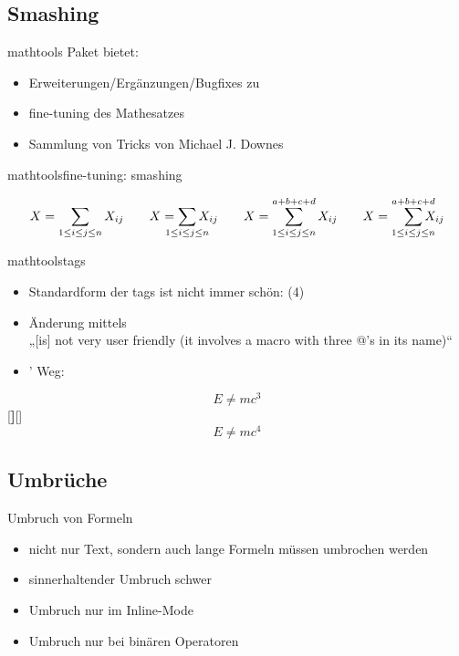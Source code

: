 \documentclass[
	vorläufig=false,
	datum=2022-11-09,
	titel={Mathematiksatz},
	web=false,
	max,
	aspectratio=1610,
]{../tex/latexkurs-slides}
\begin{document}
\subsection{Smashing}
\begin{frame}{mathtools}
\vfill
Paket  bietet:
\begin{itemize}
\item Erweiterungen/Ergänzungen/Bugfixes zu 
\item fine-tuning des Mathesatzes
\item Sammlung von Tricks von Michael J. Downes
\end{itemize}
\end{frame}

\begin{frame}[fragile]{mathtools}{fine-tuning: smashing}
\begin{LTXexample}[pos=t]
\[
  X = \sum_{1\le i\le j\le n} X_{ij} \qquad
  X = \sum_{\mathclap{1\le i\le j\le n}} X_{ij} \qquad
  X = \sum_{\mathclap{1\le i\le j\le n}}^{a+b+c+d} X_{ij} \qquad
  X = \smashoperator[r]{\sum_{1\le i\le j\le n}^{a+b+c+d}} X_{ij}
\]
\end{LTXexample}
\end{frame}

\begin{frame}[fragile]{mathtools}{tags}
\begin{itemize}
\item Standardform der tags ist nicht immer schön: (4)
\item Änderung mittels \\%
„[is] not very user friendly (it involves a macro with three @’s in its name)“
\item {}’ Weg:
\end{itemize} 
\begin{LTXexample}[width=.3\textwidth]
\begin{equation}E \neq mc^3\end{equation}
[\textbf]{[}{]}
\begin{equation}E \neq mc^4\end{equation}
\end{LTXexample}
\end{frame}


\subsection{Umbrüche}
\begin{frame}{Umbruch von Formeln}
\begin{itemize}
\item nicht nur Text, sondern auch lange Formeln müssen umbrochen werden
\item sinnerhaltender Umbruch schwer
\item Umbruch nur im Inline-Mode
\item Umbruch nur bei binären Operatoren
\end{itemize}
\end{frame}
\end{document}
